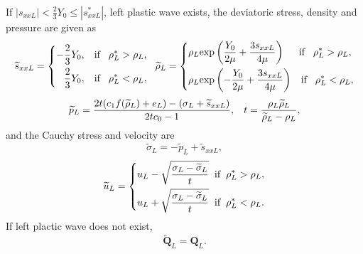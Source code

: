 \documentclass{article}
\theoremstyle{plain}\newtheorem{definition}{\sc{Definition}}
\theoremstyle{defination}\newtheorem{example}{Example}[section]
\numberwithin{equation}{section}
\numberwithin{table}{section}
\begin{document}
\vspace{0.3cm} \hspace{0.4cm}  If $|s_{xxL}| < \frac{2}{3}Y_0 \le |s_{xxL}^*| $, left plastic wave exists, the deviatoric stress, density and pressure  are given as
\begin{equation*}
  \widetilde{s}_{xxL} =\left\{ \begin{aligned}
	  -\frac{2}{3}Y_0, \hspace{0.3cm} \text{if} \hspace{0.3cm} \rho_L^* > \rho_L,\\
	  \frac{2}{3}Y_0, \hspace{0.3cm} \text{if} \hspace{0.3cm} \rho_L^* < \rho_L,\\
	\end{aligned}\right.
	\hspace{0.2cm} \widetilde{\rho}_{L} = \left\{ \begin{aligned}
	  & \rho_L \text{exp}\left(\frac{Y_0}{2\mu}+\frac{3 s_{xxL}}{4\mu}\right)  \hspace{0.5cm} \text{if} \hspace{0.3cm} \rho_L^* > \rho_L,\\ 
& \rho_L \text{exp}\left(-\frac{Y_0}{2\mu}+\frac{3 s_{xxL}}{4\mu}\right) 
\hspace{0.3cm} \text{if} \hspace{0.3cm} \rho_L^* < \rho_L,\\ 
  \end{aligned}\right.
 \end{equation*}
\begin{equation*}
  \widetilde{p}_L= \frac{2t(c_1f(\widetilde{\rho}_L)+e_L)-(\sigma_L+\widetilde{s}_{xxL})}{2tc_0-1}, \hspace{0.3cm} 
t=\frac{\rho_L \widetilde{\rho}_L}{\widetilde{\rho}_L-\rho_L},
\end{equation*}
and the Cauchy stress and velocity are
\begin{equation*}
\widetilde{\sigma}_L = -\widetilde{p}_L+\widetilde{s}_{xxL},
\end{equation*}
\begin{equation*}
  \widetilde{u}_L= \left\{
  \begin{aligned}
	u_L-\sqrt{\frac{\sigma_L-\widetilde{\sigma}_L}{t}} \hspace{0.2cm} \text{if} \hspace{0.2cm} \rho_L^* >\rho_L,\\
	u_L+\sqrt{\frac{\sigma_L-\widetilde{\sigma}_L}{t}} \hspace{0.2cm} \text{if} \hspace{0.2cm} \rho_L^* <\rho_L.\\
\end{aligned} \right.
\end{equation*}
If left plactic wave does not exist,
\begin{equation*}
  \widetilde{\bm{Q}}_L = \bm{Q}_L.
\end{equation*}
\end{document}

